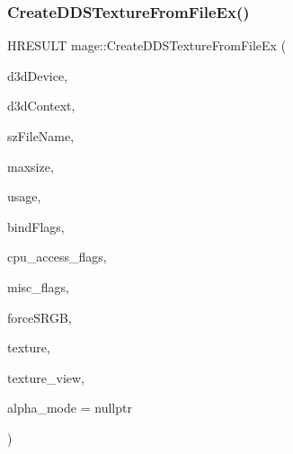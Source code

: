 \subsubsection{\texorpdfstring{Create\+D\+D\+S\+Texture\+From\+File\+Ex()}{CreateDDSTextureFromFileEx()}\hspace{0.1cm}{\footnotesize\ttfamily [2/4]}}
{\footnotesize\ttfamily H\+R\+E\+S\+U\+LT mage\+::\+Create\+D\+D\+S\+Texture\+From\+File\+Ex (\begin{DoxyParamCaption}\item[{\+\_\+\+In\+\_\+ I\+D3\+D11\+Device $\ast$}]{d3d\+Device,  }\item[{\+\_\+\+In\+\_\+opt\+\_\+ I\+D3\+D11\+Device\+Context $\ast$}]{d3d\+Context,  }\item[{\+\_\+\+In\+\_\+z\+\_\+ const wchar\+\_\+t $\ast$}]{sz\+File\+Name,  }\item[{\+\_\+\+In\+\_\+ size\+\_\+t}]{maxsize,  }\item[{\+\_\+\+In\+\_\+ D3\+D11\+\_\+\+U\+S\+A\+GE}]{usage,  }\item[{\+\_\+\+In\+\_\+ uint32\+\_\+t}]{bind\+Flags,  }\item[{\+\_\+\+In\+\_\+ uint32\+\_\+t}]{cpu\+\_\+access\+\_\+flags,  }\item[{\+\_\+\+In\+\_\+ uint32\+\_\+t}]{misc\+\_\+flags,  }\item[{\+\_\+\+In\+\_\+ bool}]{force\+S\+R\+GB,  }\item[{\+\_\+\+Outptr\+\_\+opt\+\_\+ I\+D3\+D11\+Resource $\ast$$\ast$}]{texture,  }\item[{\+\_\+\+Outptr\+\_\+opt\+\_\+ I\+D3\+D11\+Shader\+Resource\+View $\ast$$\ast$}]{texture\+\_\+view,  }\item[{\+\_\+\+Out\+\_\+opt\+\_\+ \hyperlink{namespacemage_a0c586a2bad862f4858900ca121ca80c2}{D\+D\+S\+\_\+\+A\+L\+P\+H\+A\+\_\+\+M\+O\+DE} $\ast$}]{alpha\+\_\+mode = {\ttfamily nullptr} }\end{DoxyParamCaption})}

\hypertarget{namespacemage_a9a8f907c4cce316a587e7f35e78a255c}{}\label{namespacemage_a9a8f907c4cce316a587e7f35e78a255c} 
